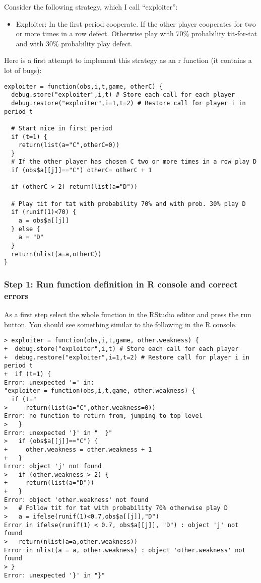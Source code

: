 \documentclass[]{article}
\begin{document}
Consider the following strategy, which I call ``exploiter'':

\begin{itemize}
\itemsep1pt\parskip0pt
\item
  Exploiter: In the first period cooperate. If the other player
  cooperates for two or more times in a row defect. Otherwise play with
  70\% probability tit-for-tat and with 30\% probability play defect.
\end{itemize}

Here is a first attempt to implement this strategy as an r function (it
contains a lot of bugs):

\begin{verbatim}
exploiter = function(obs,i,t,game, otherC) {
  debug.store("exploiter",i,t) # Store each call for each player
  debug.restore("exploiter",i=1,t=2) # Restore call for player i in period t

  # Start nice in first period
  if (t=1) {
    return(list(a="C",otherC=0))
  }
  # If the other player has chosen C two or more times in a row play D
  if (obs$a[[j]]=="C") otherC= otherC + 1

  if (otherC > 2) return(list(a="D"))

  # Play tit for tat with probability 70% and with prob. 30% play D
  if (runif(1)<70) {
    a = obs$a[[j]]
  } else {
    a = "D"
  }
  return(nlist(a=a,otherC))
}
\end{verbatim}

\subsubsection{Step 1: Run function definition in R console and correct
errors}

As a first step select the whole function in the RStudio editor and
press the run button. You should see something similar to the following
in the R console.

\begin{verbatim}
> exploiter = function(obs,i,t,game, other.weakness) {
+  debug.store("exploiter",i,t) # Store each call for each player
+  debug.restore("exploiter",i=1,t=2) # Restore call for player i in period t
+  if (t=1) {
Error: unexpected '=' in:
"exploiter = function(obs,i,t,game, other.weakness) {
  if (t="
>     return(list(a="C",other.weakness=0))
Error: no function to return from, jumping to top level
>   }
Error: unexpected '}' in "  }"
>   if (obs$a[[j]]=="C") {
+     other.weakness = other.weakness + 1
+   }
Error: object 'j' not found
>   if (other.weakness > 2) {
+     return(list(a="D"))
+   }
Error: object 'other.weakness' not found
>   # Follow tit for tat with probability 70% otherwise play D
>   a = ifelse(runif(1)<0.7,obs$a[[j]],"D")
Error in ifelse(runif(1) < 0.7, obs$a[[j]], "D") : object 'j' not found
>   return(nlist(a=a,other.weakness))
Error in nlist(a = a, other.weakness) : object 'other.weakness' not found
> }
Error: unexpected '}' in "}"
\end{verbatim}
\end{document}
